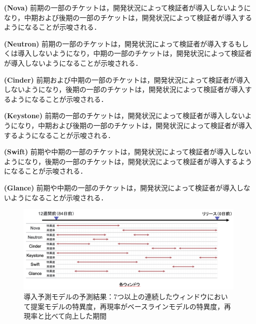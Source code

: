 \documentclass[11pt]{jreport}
\begin{document}
\textbf{ (Nova) }前期の一部のチケットは，開発状況によって検証者が導入しないようになり，中期および後期の一部のチケットは，開発状況によって検証者が導入するようになることが示唆される．

\textbf{ (Neutron) }前期の一部のチケットは，開発状況によって検証者が導入するもしくは導入しないようになり，中期の一部のチケットは，開発状況によって検証者が導入しないようになることが示唆される．

\textbf{ (Cinder) }前期および中期の一部のチケットは，開発状況によって検証者が導入しないようになり，後期の一部のチケットは，開発状況によって検証者が導入するようになることが示唆される．

\textbf{ (Keystone) }前期の一部のチケットは，開発状況によって検証者が導入しないようになり，中期および後期の一部のチケットは，開発状況によって検証者が導入するようになることが示唆される．

\textbf{ (Swift) }前期や中期の一部のチケットは，開発状況によって検証者が導入しないようになり，後期の一部のチケットは，開発状況によって検証者が導入するようになることが示唆される．

\textbf{ (Glance) }前期や中期の一部のチケットは，開発状況によって検証者が導入しないようになることが示唆される．


\begin{figure}[t]
\begin{center}
    \includegraphics[width=1.0\textwidth]{Uenaka_fig/RQ2_result/merge_sperec_window.pdf}
    \caption{導入予測モデルの予測結果：7つ以上の連続したウィンドウにおいて提案モデルの特異度，再現率がベースラインモデルの特異度，再現率と比べて向上した期間}
    \label{fig:merge_sperec_window}
\end{center}
\end{figure}
\end{document}
